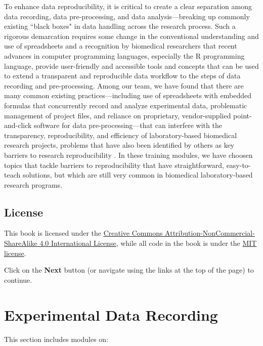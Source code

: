 \documentclass[]{tufte-book}
\begin{document}
To enhance data reproducibility, it is critical to create a clear separation
among data recording, data pre-processing, and data analysis---breaking up
commonly existing ``black boxes" in data handling across the research process.
Such a rigorous demarcation requires some change in the conventional
understanding and use of spreadsheets and a recognition by biomedical
researchers that recent advances in computer programming languages, especially
the R programming language, provide user-friendly and accessible tools and
concepts that can be used to extend a transparent and reproducible data workflow
to the steps of data recording and pre-processing. Among our team, we have found
that there are many common existing practices---including use of spreadsheets
with embedded formulas that concurrently record and analyze experimental data,
problematic management of project files, and reliance on proprietary,
vendor-supplied point-and-click software for data pre-processing---that can
interfere with the transparency, reproducibility, and efficiency of
laboratory-based biomedical research projects, problems that have also been
identified by others as key barriers to research reproducibility
\citep{broman2018data, bryan2018excuse, ellis2018share, marwick2018packaging}. In
these training modules, we have choosen topics that tackle barriers to
reproducibility that have straightforward, easy-to-teach solutions, but which
are still very common in biomedical laboratory-based research programs.

\hypertarget{license}{%
\section{License}\label{license}}

This book is licensed under the \href{https://creativecommons.org/licenses/by-nc-sa/4.0/}{Creative Commons
Attribution-NonCommercial-ShareAlike 4.0 International
License}, while all code in
the book is under the \href{https://opensource.org/licenses/MIT}{MIT license}.

Click on the \textbf{Next} button (or navigate using the
links at the top of the page) to continue.

\hypertarget{experimental-data-recording}{%
\chapter{Experimental Data Recording}\label{experimental-data-recording}}

This section includes modules on:
\end{document}
